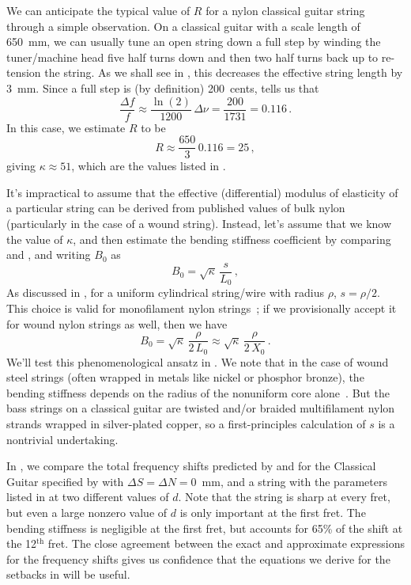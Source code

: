  We can anticipate the typical value of $R$ for a nylon classical guitar string through a simple observation. On a classical guitar with a scale length of 650~mm, we can usually tune an open string down a full step by winding the tuner/machine head five half turns down and then two half turns back up to re-tension the string. As we shall see in , this decreases the effective string length by 3~mm. Since a full step is (by definition) 200~cents,  tells us that
\begin{equation}
  \frac{\Delta f}{f} \approx \frac{\ln(2)}{1200}\, \Delta \nu = \frac{200}{1731} = 0.116\, .
\end{equation}
In this case, we estimate $R$ to be
\begin{equation}
  R \approx \frac{650}{3}\, 0.116 = 25\, ,
\end{equation}
giving $\kappa \approx 51$, which are the values listed in . 

It's impractical to assume that the effective (differential) modulus of elasticity of a particular string can be derived from published values of bulk nylon (particularly in the case of a wound string). Instead, let's assume that we know the value of $\kappa$, and then estimate the bending stiffness coefficient by comparing  and , and writing $B_0$ as
\begin{equation}
  B_0 = \sqrt{\kappa}\, \frac{s}{L_0}\, ,
\end{equation}
As discussed in , for a uniform cylindrical string/wire with radius $\rho$, $s = \rho/2$. This choice is valid for monofilament nylon strings~\cite{ref:woodland2004pgt}; if we provisionally accept it for wound nylon strings as well, then we have
\begin{equation} \label{eqn:b_0_kappa}
  B_0 = \sqrt{\kappa}\, \frac{\rho}{2\, L_0} \approx \sqrt{\kappa}\, \frac{\rho}{2\, X_0}\, .
\end{equation}
We'll test this phenomenological ansatz in . We note that in the case of wound steel strings (often wrapped in metals like nickel or phosphor bronze), the bending stiffness depends on the radius of the nonuniform core alone~\cite{ref:fletcher1964nvf,ref:kemp2020ibg}. But the bass strings on a classical guitar are twisted and/or braided multifilament nylon strands wrapped in silver-plated copper, so a first-principles calculation of $s$ is a nontrivial undertaking.

In , we compare the total frequency shifts predicted by  and  for the Classical Guitar specified by  with $\Delta S = \Delta N = 0$~mm, and a string with the parameters listed in  at two different values of $d$. Note that the string is sharp at every fret, but even a large nonzero value of $d$ is only important at the first fret. The bending stiffness is negligible at the first fret, but accounts for 65\% of the shift at the 12$^\textrm{th}$ fret. The close agreement between the exact and approximate expressions for the frequency shifts gives us confidence that the equations we derive for the setbacks in  will be useful.

